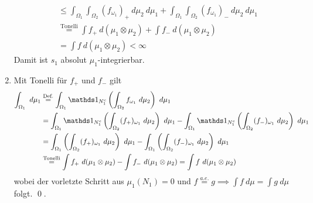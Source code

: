 \begin{enumerate}[label=(\roman*)]
\begin{align*}
        &\leq\int_{\Omega_1}\int_{\Omega_2}(f_{\omega_1})_+\ d\mu_2\ d\mu_1+\int_{\Omega_1}\int_{\Omega_2}(f_{\omega_1})_-  \ d\mu_2\ d\mu_1\\
        &\overset{\text{Tonelli}}{=}\int f_+\ d(\mu_1\otimes\mu_2)+\int f_-\ d(\mu_1\otimes\mu_2)\\&=\int f\ d(\mu_1\otimes\mu_2)<\infty
    \end{align*}
    Damit ist $s_1$ absolut $\mu_1$-integrierbar.
    \item Mit Tonelli f\"ur $f_+$ und $f_-$ gilt
    \begin{align*}
        \int_{\Omega_1}\ d\mu_1&    \overset{\text{Def.}}{=}\int_{\Omega_1}\ind{N_1^c}\left(\int_{\Omega_2}f_{\omega_1}\ d\mu_2\right)\ d\mu_1\\
        &=\int_{\Omega_1}\ind{N_1^c}\left(\int_{\Omega_2}(f_+)_{\omega_1}\ d\mu_2\right)\ d\mu_1-\int_{\Omega_1}\ind{N_1^c}\left(\int_{\Omega_2}(f_-)_{\omega_1}\ d\mu_2\right)\ d\mu_1\\
        &=\int_{\Omega_1}\left(\int_{\Omega_2}(f_+)_{\omega_1}\ d\mu_2\right)\ d\mu_1-\int_{\Omega_1}\left(\int_{\Omega_2}(f_-)_{\omega_1}\ d\mu_2\right)\ d\mu_1\\
        &\overset{\text{Tonelli}}{=}\int f_+\ d(\mu_1\otimes\mu_2)-\int f_-\ d(\mu_1\otimes\mu_2)=\int f\ d(\mu_1\otimes\mu_2)
    \end{align*}
    wobei der vorletzte Schritt aus $\mu_1(N_1)=0$ und $f\overset{a.e.}{=}g\implies\int f\ d\mu=\int g\ d\mu$ folgt. \qed.
\end{enumerate}

